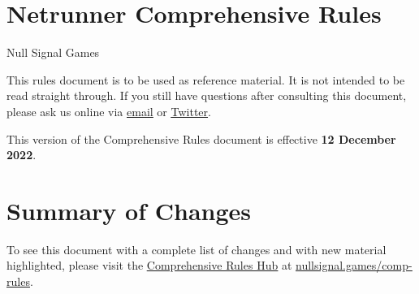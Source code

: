\documentclass{article}
\newcommand*{\subtitle}[1]{{\Large #1 \vspace{2ex}}}
\newcommand*{\hreful}[2]{\href{#1}{\color{blue}\setulcolor{blue}\ul{#2}}}
\begin{document}

\section*{\Huge{Netrunner Comprehensive Rules}}
\subtitle{\color{darkgray}Null Signal Games}

\noindent
This rules document is to be used as reference material. It is not intended to be read straight through. If you still have questions after consulting this document, please ask us online via \hreful{mailto:rules@nullsignal.games}{email} or \hreful{https://twitter.com/Netrunner_Rules}{Twitter}.

\noindent
This version of the Comprehensive Rules document is effective \textbf{12 December 2022}.

\section*{Summary of Changes}

\noindent
To see this document with a complete list of changes and with new material highlighted, please visit the \hreful{https://nullsignal.games/comp-rules}{Comprehensive Rules Hub} at \textlangle{}\hreful{https://nullsignal.games/comp-rules}{nullsignal.games/comp-rules}\textrangle.

\begin{outline}[enumerate]
\end{outline}


\newpage

\section*{}

\makeatletter
\renewcommand{\l@section}{\@dottedtocline{1}{1.8em}{1.4em}}
\renewcommand{\l@subsection}{\@dottedtocline{2}{3.4em}{2.5em}}
\renewcommand{\l@subsubsection}{\@dottedtocline{3}{6em}{2.5em}}
\makeatother


\begin{multicols}{2}
  \tableofcontents
\end{multicols}
\end{document}
